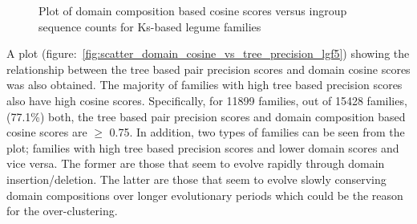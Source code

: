 \documentclass{article}
\begin{document}
		\begin{figure}
			\caption{Plot of domain composition based cosine scores versus ingroup sequence counts for Ks-based legume families}
			\label{fig:scatter_domain_cosine_vs_seq_ct_lgf5}
		\end{figure}
		
		A plot (figure:~\ref{fig:scatter_domain_cosine_vs_tree_precision_lgf5}) showing the relationship between the tree based pair precision scores and domain cosine scores was also obtained. The majority of families with high tree based precision scores also have high cosine scores. Specifically, for 11899 families, out of 15428 families, (77.1\%) both, the tree based pair precision scores and domain composition based cosine scores are $\geq$ 0.75.  In addition, two types of families can be seen from the plot; families with high tree based precision scores and lower domain scores and vice versa. The former are those that seem to evolve rapidly through domain insertion/deletion. The latter are those that seem to evolve slowly conserving domain compositions over longer evolutionary periods which could be the reason for the over-clustering.
		
\end{document}
